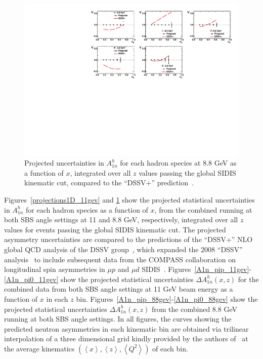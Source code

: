\begin{figure}[h]
  \begin{center}
    \includegraphics[width=.98\textwidth]{figures/Projections1D_summary88gev.pdf}
  \end{center}
  \caption{\label{projections1D_88gev} Projected uncertainties in $A_{1n}^h$ for each hadron species at 8.8 GeV as a function of $x$, integrated over all $z$ values passing the global SIDIS kinematic cut, compared to the ``DSSV+'' prediction~\cite{DSSVplus}.}
\end{figure}
Figures~\ref{projections1D_11gev} and \ref{projections1D_88gev} show the projected statistical uncertainties in $A_{1n}^h$ for each hadron species as a function of $x$, from the combined running at both SBS angle settings at 11 and 8.8 GeV, respectively, integrated over all $z$ values for events passing the global SIDIS kinematic cut. The projected asymmetry uncertainties are compared to the predictions of the ``DSSV+'' NLO global QCD analysis of the DSSV group~\cite{DSSVplus}, which expanded the 2008 ``DSSV'' analysis~\cite{DSSV2008,DSSV2009} to include subsequent data from the COMPASS collaboration on longitudinal spin asymmetries in $\mu p$ and $\mu d$ SIDIS~\cite{COMPASS_d_2009,COMPASS_d_p_2010}. Figures~\ref{A1n_pip_11gev}-\ref{A1n_pi0_11gev} show the projected statistical uncertainties $\Delta A_{1n}^{h}(x,z)$ for the combined data from both SBS angle settings at 11 GeV beam energy as a function of $x$ in each $z$ bin. Figures~\ref{A1n_pip_88gev}-\ref{A1n_pi0_88gev} show the projected statistical uncertainties $\Delta A_{1n}^{h}(x,z)$ from the combined 8.8 GeV running at both SBS angle settings. In all figures, the curves showing the predicted neutron asymmetries in each kinematic bin are obtained via trilinear interpolation of a three dimensional grid kindly provided by the authors of~\cite{DSSVplus} at the average kinematics $(\left<x\right>, \left<z\right>, \left<Q^2\right>)$ of each bin. 
